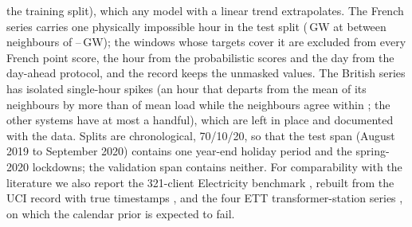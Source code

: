 the training split), which any model with a linear trend extrapolates. The French series carries
one physically impossible hour in the test split (\,GW at
 between neighbours of
--\,GW); the windows whose
targets cover it are excluded from every French point score, the hour from the probabilistic
scores and the day from the day-ahead protocol, and the record keeps the unmasked values. The
British series has  isolated single-hour spikes (an hour that departs
from the mean of its neighbours by more than  of mean load while the
neighbours agree within ; the other systems have at most a handful),
which are left in place and documented with the data.
Splits are chronological, 70/10/20, so that the test span (August 2019 to September 2020)
contains one year-end holiday period and the spring-2020 lockdowns; the validation span
contains neither. For comparability with the literature we also report the 321-client
Electricity benchmark \cite{lai2018lstnet}, rebuilt from the UCI record with true timestamps
\cite{uciecl}, and the four ETT transformer-station series \cite{zhou2021informer}, on which
the calendar prior is expected to fail.

